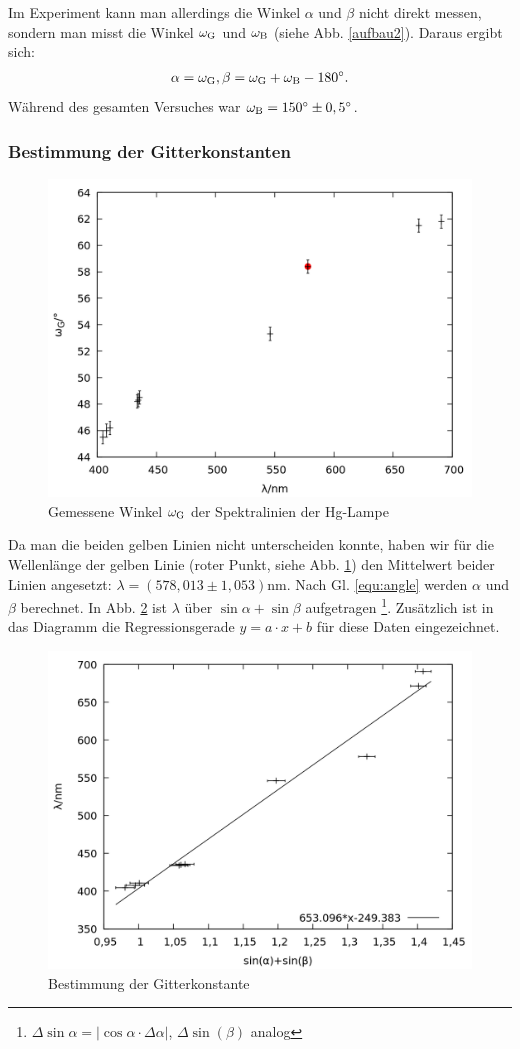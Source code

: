Im Experiment kann man allerdings die Winkel $\alpha$ und $\beta$ nicht direkt messen, sondern man misst die Winkel $\omega_\mathrm{G}$ und $\omega_\mathrm{B}$ (siehe Abb. \ref{aufbau2}). Daraus ergibt sich:
\begin{align}
\alpha = \omega_\mathrm{G}, \beta = \omega_\mathrm{G}+\omega_\mathrm{B}-180^\circ.
\label{equ:angle}
\end{align}
Während des gesamten Versuches war $\omega_\mathrm{B}=150^\circ \pm 0,5^\circ$.

\subsubsection{Bestimmung der Gitterkonstanten}
\begin{figure}[h]
  \centering
  \includegraphics[width=0.75\linewidth]{data/Balmer/out_hg_raw.png}
  \caption{Gemessene Winkel $\omega_\mathrm{G}$ der Spektralinien der Hg-Lampe}
  \label{fig:hg_raw}
\end{figure}

Da man die beiden gelben Linien nicht unterscheiden konnte, haben wir für die Wellenlänge der gelben Linie (roter Punkt, siehe Abb. \ref{fig:hg_raw}) den Mittelwert beider Linien angesetzt: $\lambda = \si{(578,013 \pm 1,053) \nano \metre}$. Nach Gl. \ref{equ:angle} werden $\alpha$ und $\beta$ berechnet. In Abb. \ref{fig:hg} ist $\lambda$ über $\sin{\alpha} + \sin{\beta}$ aufgetragen \footnote{$\Delta \sin{\alpha} = |\cos{\alpha} \cdot \Delta \alpha|$, $\Delta \sin(\beta)$ analog}. Zusätzlich ist in das Diagramm die Regressionsgerade $y = a\cdot x + b$ für diese Daten eingezeichnet.
\begin{figure}[h]
  \centering
  \includegraphics[width=0.75\linewidth]{data/Balmer/out_hg.png}
  \caption{Bestimmung der Gitterkonstante}
  \label{fig:hg}
\end{figure}

